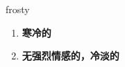 
\begin{frame}
{\huge frosty}
\begin{center}
\begin{enumerate}\Large
  \item \textbf{寒冷的}
  \item \textbf{无强烈情感的，冷淡的}
\end{enumerate}
\end{center}
\end{frame}

